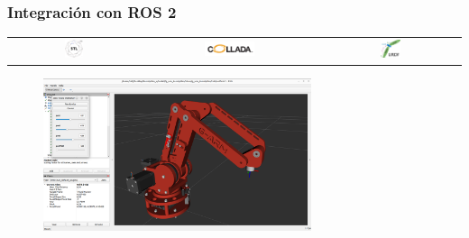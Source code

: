 \documentclass{beamer}
\begin{document}
\begin{frame}
\frametitle{Integración con ROS 2}
\begin{table}[htbp]
  \centering
  \begin{tabular}{ccc}
      \includegraphics[width=0.15\textwidth, valign=m]{figs/STL.jpg} & \includegraphics[width=0.3\textwidth, valign=m]{figs/collada.png} 
       & \includegraphics[width=0.15\textwidth, valign=m]{figs/urdf.png} \\
      
  \end{tabular}
\end{table} 
\begin{figure}[h]
  
\centering
\includegraphics[width=0.7\textwidth]{figs/rviz.png}
\end{figure}  
\end{frame}
\end{document}

